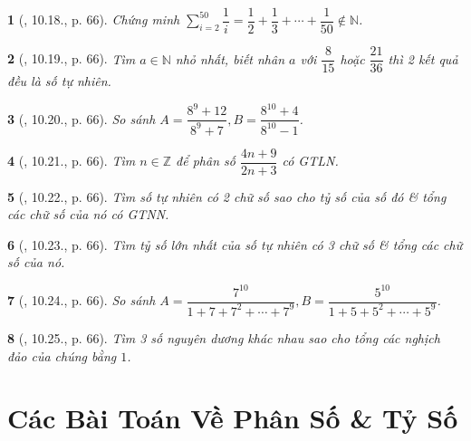 \documentclass{article}
\newtheorem{baitoan}{}
\begin{document}
\begin{baitoan}[\cite{TLCT_THCS_Toan_6_so_hoc}, 10.18., p. 66]
	Chứng minh $\sum_{i=2}^{50} \dfrac{1}{i} = \dfrac{1}{2} + \dfrac{1}{3} + \cdots + \dfrac{1}{50}\notin\mathbb{N}$.
\end{baitoan}

\begin{baitoan}[\cite{TLCT_THCS_Toan_6_so_hoc}, 10.19., p. 66]
	Tìm $a\in\mathbb{N}$ nhỏ nhất, biết nhân $a$ với $\dfrac{8}{15}$ hoặc $\dfrac{21}{36}$ thì 2 kết quả đều là số tự nhiên.
\end{baitoan}

\begin{baitoan}[\cite{TLCT_THCS_Toan_6_so_hoc}, 10.20., p. 66]
	So sánh $A = \dfrac{8^9 + 12}{8^9 + 7},B = \dfrac{8^{10} + 4}{8^{10} - 1}$.
\end{baitoan}

\begin{baitoan}[\cite{TLCT_THCS_Toan_6_so_hoc}, 10.21., p. 66]
	Tìm $n\in\mathbb{Z}$ để phân số $\dfrac{4n + 9}{2n + 3}$ có {\rm GTLN}.
\end{baitoan}

\begin{baitoan}[\cite{TLCT_THCS_Toan_6_so_hoc}, 10.22., p. 66]
	Tìm số tự nhiên có 2 chữ số sao cho tỷ số của số đó \& tổng các chữ số của nó có {\rm GTNN}.
\end{baitoan}

\begin{baitoan}[\cite{TLCT_THCS_Toan_6_so_hoc}, 10.23., p. 66]
	Tìm tỷ số lớn nhất của số tự nhiên có 3 chữ số \& tổng các chữ số của nó.
\end{baitoan}

\begin{baitoan}[\cite{TLCT_THCS_Toan_6_so_hoc}, 10.24., p. 66]
	So sánh $A = \dfrac{7^{10}}{1 + 7 + 7^2 + \cdots + 7^9},B = \dfrac{5^{10}}{1 + 5 + 5^2 + \cdots + 5^9}$.
\end{baitoan}

\begin{baitoan}[\cite{TLCT_THCS_Toan_6_so_hoc}, 10.25., p. 66]
	Tìm 3 số nguyên dương khác nhau sao cho tổng các nghịch đảo của chúng bằng $1$.
\end{baitoan}


\section{Các Bài Toán Về Phân Số \& Tỷ Số}
\end{document}
